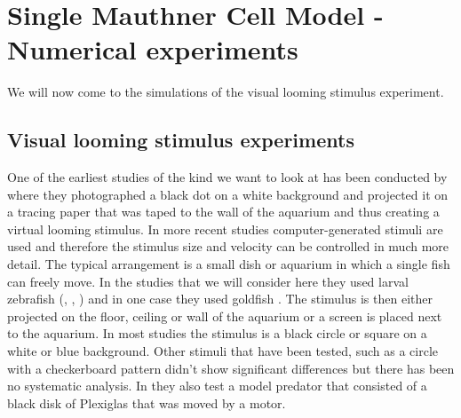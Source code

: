 \documentclass[a4paper,10pt,hidelinks]{scrreprt}
\begin{document}
	\chapter{Single Mauthner Cell Model - Numerical experiments}
	We will now come to the simulations of the visual looming stimulus experiment.
	\section{Visual looming stimulus experiments}
	One of the earliest studies of the kind we want to look at has been conducted by 
	\citep{Dill1974} where they photographed a black dot on a white background and projected it on 
	a tracing paper that was taped to the wall of the aquarium and thus creating a virtual looming 
	stimulus.
	In more recent studies computer-generated stimuli are used and therefore the stimulus size 
	and velocity can be controlled in much more detail.
	The typical arrangement is a small dish or aquarium in which a single fish can freely move. 
	In the studies that we will consider here they used larval zebrafish (\cite{Temizer2015}, 
	\cite{Dunn2016}, \cite{Bhattacharyya2017}) and in one case they used goldfish 
	\citep{Preuss2006}.
	The stimulus is then either projected on the floor, ceiling or wall of the aquarium or a screen 
	is placed next to the aquarium.
	In most studies the stimulus is a black circle or square on a white or blue background.
	Other stimuli that have been tested, such as a circle with a checkerboard pattern didn't show 
	significant differences but there has been no systematic analysis.
	In \cite{Dill1974} they also test a model predator that consisted of a black disk of Plexiglas 
	that was moved by a motor.
	
\end{document}
